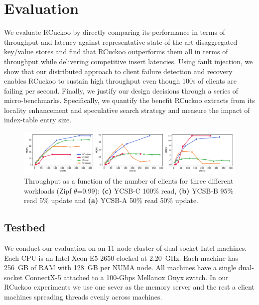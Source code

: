 \section{Evaluation}
\label{sec:eval}

We evaluate RCuckoo by directly comparing its performance in terms of
throughput and latency against representative state-of-the-art
disaggregated key/value stores and find that RCuckoo outperforms them
all in terms of throughput while delivering competitive insert
latencies.  Using fault injection, we show that our distributed
approach to client failure detection and recovery enables RCuckoo to
sustain high throughput even though 100s of clients are failing per
second.  Finally, we justify our design decisions through a series of
micro-benchmarks. Specifically, we quantify the benefit RCuckoo
extracts from its locality enhancement and speculative search strategy
and measure the impact of
index-table entry size.



\begin{figure}[ht]
    \includegraphics[width=0.99\linewidth]{fig/hero_ycsb_throughput.pdf}

    \caption{Throughput as a function of the number of clients for three different workloads (Zipf $\theta$=0.99): 
    \textbf{(c)} YCSB-C 100\% read, \textbf{(b)} YCSB-B 95\% read 5\% update and \textbf{(a)} YCSB-A 50\% read 50\% update.}
    \label{fig:ycsb_throughput}
 \end{figure}


\subsection{Testbed}

We conduct our evaluation on an 11-node cluster of dual-socket Intel
machines. Each CPU is an Intel Xeon E5-2650 clocked at
2.20~GHz. Each machine has 256~GB of RAM with 128~GB per NUMA
node. All machines have a single dual-socket ConnectX-5 attached to a
100-Gbps Mellanox Onyx switch. In our RCuckoo experiments we use one
sever as the memory server and the rest a client machines
spreading threads evenly across machines.

